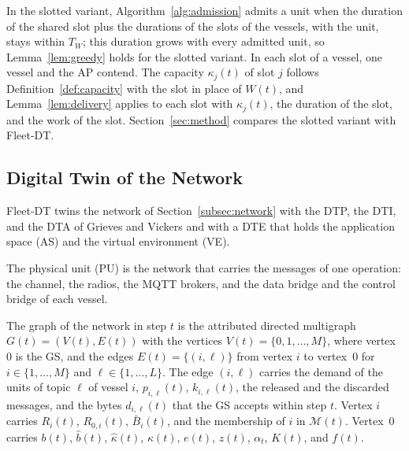In the slotted variant, Algorithm~\ref{alg:admission} admits a unit when the duration of the shared slot plus the durations of the slots of the vessels, with the unit, stays within $T_W$; this duration grows with every admitted unit, so Lemma~\ref{lem:greedy} holds for the slotted variant. In each slot of a vessel, one vessel and the AP contend. The capacity $\kappa_j(t)$ of slot $j$ follows Definition~\ref{def:capacity} with the slot in place of $W(t)$, and Lemma~\ref{lem:delivery} applies to each slot with $\kappa_j(t)$, the duration of the slot, and the work of the slot. Section~\ref{sec:method} compares the slotted variant with Fleet-DT.

\subsection{Digital Twin of the Network}\label{subsec:dts}

Fleet-DT twins the network of Section~\ref{subsec:network} with the DTP, the DTI, and the DTA of Grieves and Vickers and with a DTE that holds the application space (AS) and the virtual environment (VE).

\begin{definition}\label{def:pu}
The physical unit (PU) is the network that carries the messages of one operation: the channel, the radios, the MQTT brokers, and the data bridge and the control bridge of each vessel.
\end{definition}

\begin{definition}\label{def:graph}
The graph of the network in step $t$ is the attributed directed multigraph $G(t) = (V(t), E(t))$ with the vertices $V(t) = \{0, 1, \dots, M\}$, where vertex~$0$ is the GS, and the edges $E(t) = \{(i, \ell)\}$ from vertex $i$ to vertex~$0$ for $i \in \{1, \dots, M\}$ and $\ell \in \{1, \dots, L\}$. The edge $(i, \ell)$ carries the demand of the units of topic $\ell$ of vessel $i$, $p_{i,\ell}(t)$, $k_{i,\ell}(t)$, the released and the discarded messages, and the bytes $d_{i,\ell}(t)$ that the GS accepts within step $t$. Vertex $i$ carries $R_i(t)$, $R_{0,i}(t)$, $\bar{B}_i(t)$, and the membership of $i$ in $\mathcal{M}(t)$. Vertex~$0$ carries $b(t)$, $\hat{b}(t)$, $\hat{\kappa}(t)$, $\kappa(t)$, $e(t)$, $z(t)$, $\alpha_t$, $K(t)$, and $f(t)$.
\end{definition}

